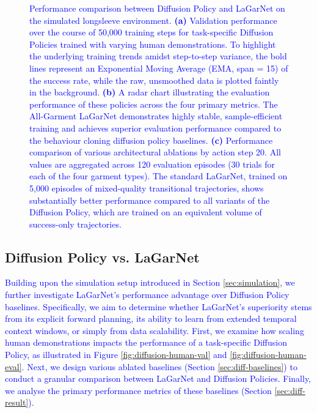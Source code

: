 \documentclass[journal]{IEEEtran}
\newcommand{\addadvantage}[1]{\textcolor{blue}{#1}}
\begin{document}
\begin{figure}[t!]
    \caption{\addadvantage{Performance comparison between Diffusion Policy and LaGarNet on the simulated longsleeve environment. \textbf{(a)} Validation performance over the course of 50,000 training steps for task-specific Diffusion Policies trained with varying human demonstrations. To highlight the underlying training trends amidst step-to-step variance, the bold lines represent an Exponential Moving Average (EMA, span = 15) of the success rate, while the raw, unsmoothed data is plotted faintly in the background. \textbf{(b)} A radar chart illustrating the evaluation performance of these policies across the four primary metrics. The All-Garment LaGarNet demonstrates highly stable, sample-efficient training and achieves superior evaluation performance compared to the behaviour cloning diffusion policy baselines. \textbf{(c)} Performance comparison of various architectural ablations by action step 20. All values are aggregated across 120 evaluation episodes (30 trials for each of the four garment types). The standard LaGarNet, trained on 5,000 episodes of mixed-quality transitional trajectories, shows substantially better performance compared to all variants of the Diffusion Policy, which are trained on an equivalent volume of success-only trajectories.}} 
    \label{fig:diff-vs-lagarnet-performance-combined}
\end{figure}





\subsection{Diffusion Policy vs. LaGarNet}  \label{sec:comp-diff}


\addadvantage{Building upon the simulation setup introduced in Section \ref{sec:simulation}, we further investigate LaGarNet's performance advantage over Diffusion Policy baselines. Specifically, we aim to determine whether LaGarNet's superiority stems from its explicit forward planning, its ability to learn from extended temporal context windows, or simply from data scalability. First, we examine how scaling human demonstrations impacts the performance of a task-specific Diffusion Policy, as illustrated in Figure \ref{fig:diffusion-human-val} and \ref{fig:diffusion-human-eval}. Next, we design various ablated baselines (Section \ref{sec:diff-baselines}) to conduct a granular comparison between LaGarNet and Diffusion Policies. Finally, we analyse the primary performance metrics of these baselines (Section \ref{sec:diff-result}).} 
\end{document}
